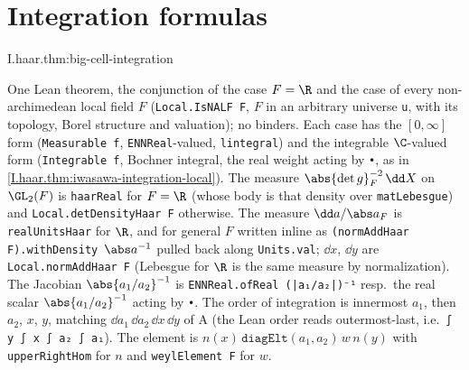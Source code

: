 \section{Integration formulas}
\begin{theorem}
\end{theorem}
\begin{tfformal}{I.haar.thm:big-cell-integration}
\begin{tffidelity}
One Lean theorem, the conjunction of the case $F=\R$ and the case of every non-archimedean local field $F$ (\texttt{Local.IsNALF F}, $F$ in an arbitrary universe \texttt{u}, with its topology, Borel structure and valuation); no binders. Each case has the $[0,\infty]$ form (\texttt{Measurable f}, \texttt{ENNReal}-valued, \texttt{lintegral}) and the integrable $\C$-valued form (\texttt{Integrable f}, Bochner integral, the real weight acting by \texttt{•}, as in \cref{I.haar.thm:iwasawa-integration-local}).
The measure $\abs{\det g}_F^{-2}\,\dd X$ on $\GL_2(F)$ is \texttt{haarReal} for $F=\R$ (whose body is that density over \texttt{matLebesgue}) and \texttt{Local.detDensityHaar F} otherwise. The measure $\dd a/\abs a_F$ is \texttt{realUnitsHaar} for $\R$, and for general $F$ written inline as \texttt{(normAddHaar F).withDensity $\abs a^{-1}$} pulled back along \texttt{Units.val}; $\dd x$, $\dd y$ are \texttt{Local.normAddHaar F} (Lebesgue for $\R$ is the same measure by normalization). The Jacobian $\abs{a_1/a_2}^{-1}$ is \texttt{ENNReal.ofReal (|a₁/a₂|)⁻¹} resp.\ the real scalar $\abs{a_1/a_2}^{-1}$ acting by \texttt{•}. The order of integration is innermost $a_1$, then $a_2$, $x$, $y$, matching $\dd a_1\,\dd a_2\,\dd x\,\dd y$ of A (the Lean order reads outermost-last, i.e.\ \texttt{∫ y ∫ x ∫ a₂ ∫ a₁}). The element is $n(x)\,\texttt{diagElt}(a_1,a_2)\,w\,n(y)$ with \texttt{upperRightHom} for $n$ and \texttt{weylElement F} for $w$.
\end{tffidelity}
\end{tfformal}
